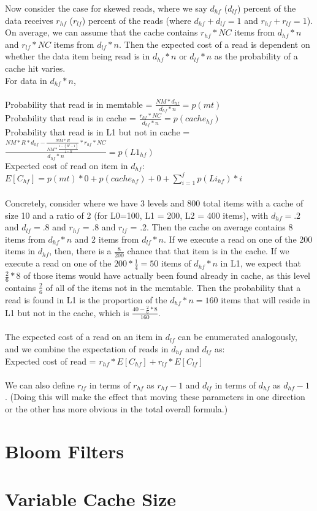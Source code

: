 \documentclass[11pt]{article}
\theoremstyle{plain}
\theoremstyle{definition}
\begin{document}
Now consider the case for skewed reads, where we say $d_{hf}$ ($d_{lf}$) percent of the data receives $r_{hf}$ ($r_{lf}$) percent of the reads (where $d_{hf} + d_{lf} = 1$ and $r_{hf} + r_{lf} = 1$). On average, we can assume that the cache contains $r_{hf} * NC$ items from $d_{hf} * n$ and $r_{lf} * NC$ items from $d_{lf} * n$. Then the expected cost of a read is dependent on whether the data item being read is in $d_{hf} * n$ or $d_{lf} * n$ as the probability of a cache hit varies.\\
For data in $d_{hf} * n$, \\ \\
Probability that read is in memtable = $\frac{NM*d_{hf}}{d_{hf} *n}  = p(mt)$\\
Probability that read is in cache = $\frac{r_{hf} * NC}{d_{hf} * n} = p(cache_{hf})$ \\
Probability that read is in L1 but not in cache = $ \frac{NM * R*d_{hf} - \frac{NM * R}{NM * \frac{1-(R^j-1)}{1-R}} * r_{hf} * NC}{d_{hf} * n}  = p(L1_{hf})$ \\
Expected cost of read on item in $d_{hf}$: $E[C_{hf}]= p(mt) * 0  + p(cache_{hf}) + 0 + \sum_{i=1}^j p(Li_{hf}) * i$\\ \\
Concretely, consider where we have 3 levels and 800 total items with a cache of size 10 and a ratio of 2  (for L0=100, L1 = 200, L2 = 400 items), with $d_{hf} = .2$ and $d_{lf} = .8$ and $r_{hf}$ = .8 and $r_{lf}$ = .2. Then the cache on average contains 8 items from $d_{hf} * n$ and 2 items from $d_{lf}*n$. If we execute a read on one of the 200 items in $d_{hf}$, then, there is a $\frac{8}{200}$ chance that that item is in the cache. If we execute a read on one of the $200*\frac{1}{4} = 50$ items of  $d_{hf} * n$ in L1, we expect that $\frac{2}{6} * 8$ of those items would have actually been found already in cache, as this level contains $\frac{2}{6}$ of all of the items not in the memtable. Then the probability that a read is found in L1 is the proportion of the $d_{hf} * n = 160$ items that will reside in L1 but not in the cache, which is $\frac{40 - \frac{2}{6} * 8}{160}$. \\ \\
The expected cost of a read on an item in $d_{lf}$ can be enumerated analogously, and we combine the expectation of reads in $d_{hf}$ and $d_{lf}$ as: \\
Expected cost of read = $r_{hf} * E[C_{hf}] + r_{lf} * E[C_{lf}]$ \\ \\
We can also define $r_{lf}$ in terms of $r_{hf}$ as $r_{hf} - 1$ and  $d_{lf}$ in terms of $d_{hf}$ as $d_{hf} - 1$ . (Doing this will make the effect that moving these parameters in one direction or the other has more obvious in the total overall formula.)
\section{Bloom Filters}

\section{Variable Cache Size}
 
\end{document}
